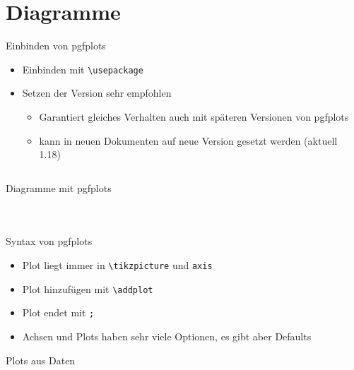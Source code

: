\documentclass[presentation,aspectratio=169]{beamer}
\begin{document}
\section{Diagramme}

\begin{frame}[fragile]{Einbinden von pgfplots}
  \begin{itemize}
    \item Einbinden mit \verb|\usepackage|
    \item Setzen der Version sehr empfohlen
      \begin{itemize}
        \item Garantiert gleiches Verhalten auch mit späteren Versionen von pgfplots
        \item kann in neuen Dokumenten auf neue Version gesetzt werden (aktuell 1.18)
      \end{itemize}
  \end{itemize}
  \inputminted{latex}{codebeispiele/pgfplots-setup.tex}
\end{frame}

\begin{frame}[fragile]{Diagramme mit pgfplots}
  \begin{columns}
    \begin{column}{.49\textwidth}
      
    \end{column}
    \begin{column}{.5\textwidth}
      \inputminted{latex}{codebeispiele/pgfplots.tex}
    \end{column}
  \end{columns}
\end{frame}

\begin{frame}[fragile]{Syntax von pgfplots}
  \begin{itemize}
    \item Plot liegt immer in \verb|\tikzpicture| und \verb|axis|
    \item Plot hinzufügen mit \verb|\addplot|
    \item Plot endet mit \verb|;|
    \item Achsen und Plots haben sehr viele Optionen, es gibt aber Defaults
  \end{itemize}
\end{frame}

\begin{frame}{Plots aus Daten}
\end{frame}
\end{document}
